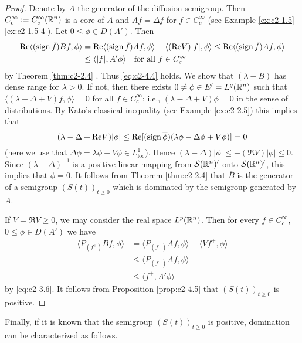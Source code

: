 \begin{proof}
Denote by $A$ the generator of the diffusion semigroup. 
Then $C^{\infty}_{c} := C^{\infty}_{c}(\mathbb{R}^{n})$ is a core of $A$ and $Af = \Delta f$ for $f \in C^{\infty}_{c}$ (see Example \ref{ex:c2-1.5}\ref{ex:c2-1.5-4}). 
Let $0 \leq \phi \in D(A')$. Then
\begin{align*}
\mathop{}\!\mathrm{Re}\langle(\operatorname{sign} \bar{f})Bf,\phi\rangle &= \mathop{}\!\mathrm{Re}\langle(\operatorname{sign} \bar{f})Af,\phi\rangle - \langle(\mathop{}\!\mathrm{Re} V)|f|,\phi\rangle \leq \mathop{}\!\mathrm{Re}\langle(\operatorname{sign} \bar{f})Af,\phi\rangle\\
&\leq \langle|f|,A'\phi\rangle \quad \text{for all } f \in C^{\infty}_{c} 
\end{align*}
by Theorem \ref{thm:c2-2.4}  .
Thus \eqref{eq:c2-4.4} holds.
We show that $(\lambda - B)$ has dense range for $\lambda > 0$. 
If not, then there exists $0 \neq \phi \in E' = L^{q}(\mathbb{R}^{n})$ such that $\langle(\lambda - \Delta + V)f,\phi\rangle = 0$ for all $f \in C^{\infty}_{c}$; i.e., $(\lambda - \Delta + V)\phi = 0$ in the sense of distributions. 
By Kato's classical inequality (see Example \ref{ex:c2-2.5}) this implies that
\[
(\lambda - \Delta + \mathop{}\!\mathrm{Re} V)|\phi| \leq \mathop{}\!\mathrm{Re}[(\operatorname{sign} \overline{\phi})(\lambda\phi - \Delta\phi + V\phi)] = 0
\] 
(here we use that $\Delta\phi = \lambda\phi + V\phi \in L^{1}_{\text{loc}}$). 
Hence $(\lambda - \Delta)|\phi| \leq -(\Re V)|\phi| \leq 0$. 
Since $(\lambda - \Delta)^{-1}$ is a positive linear mapping from $\mathcal{S}(\mathbb{R}^{n})'$ onto $\mathcal{S}(\mathbb{R}^{n})'$, this implies that $\phi = 0$. 
It follows from Theorem \ref{thm:c2-2.4}   that $\overline{B}$ is the
generator of a semigroup $(S(t))_{t \geq 0}$ which is dominated by the semigroup generated by $A$.

If $V = \Re V \geq 0$, we may consider the real space $L^{p}(\mathbb{R}^{n})$. 
Then for every $f \in C^{\infty}_{c}$, $0 \leq \phi \in D(A')$ we have
\begin{align*}
\langle P_{(f^{+})}Bf,\phi\rangle &= \langle P_{(f^{+})}Af,\phi\rangle - \langle Vf^{+},\phi\rangle\\
&\leq \langle P_{(f^{+})}Af,\phi\rangle\\
&\leq \langle f^{+},A'\phi\rangle
\end{align*}
by \eqref{eq:c2-3.6}. 
It follows from  Proposition \ref{prop:c2-4.5} that $(S(t))_{t \geq 0}$ is positive.
\end{proof}

Finally, if it is known that the semigroup $(S(t))_{t \geq 0}$ is positive,
domination can be characterized as follows.

